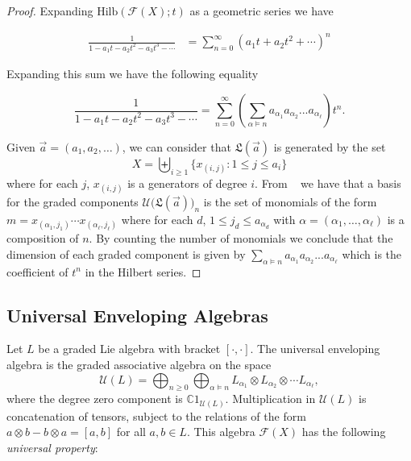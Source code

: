 \documentclass[11pt]{amsart}
\theoremstyle{definition}
\numberwithin{equation}{section}
\def\CC{{\mathbb C}}
\newcommand{\lucas}[1]{\todo[size=\tiny,color=red]{#1 \\ \hfill --- Lucas}}
\begin{document}
\begin{proof}
%
%
%
    Expanding $\mathrm{Hilb}(\mathcal{F}(X); t)$ as a geometric series we have 

    $${\begin{split}
        \frac{1}{1 - a_{1}t - a_{2}t^{2} - a_{3}t^{3} - \cdots} &= \sum_{n=0}^\infty (a_1t+a_2t^2+\cdots)^n
    \end{split}}$$

    Expanding this sum we have the following equality

    $$\frac{1}{1 - a_{1}t - a_{2}t^{2} - a_{3}t^{3} - \cdots}=\sum_{n=0}^\infty \left(\sum_ {\alpha \models n} a_{\alpha_1} a_{\alpha_2} ... a_{\alpha_\ell} \right) t^n.$$

    Given $\Vec{a} = (a_{1}, a_{2}, \ldots)$, we can consider that $\mathfrak{L}(\Vec{a})$ is generated by the set
    $$X=\biguplus_{i \geq 1}\{x_{(i,j)}: 1 \leq j \leq a_i\}$$
     where for each $j$, $x_{(i,j)}$ is a generators of degree $i$. From ~\cite[Theorem 7 (Witt)]{jacobson2013lie} we have that a basis for the graded components $\mathcal{U}\big(\mathfrak{L}(\vec{a})\big)_n$ is the set of monomials of the form $m=x_{(\alpha_1,j_1)} \cdots x_{(\alpha_\ell,j_\ell)}$ where
     for each $d$, $1 \leq j_d \leq a_{\alpha_{d}}$ with $\alpha=(\alpha_1,\dots,\alpha_\ell)$ is a composition of $n$.
By counting the number of monomials we conclude that the dimension of each graded component is given by $\sum_ {\alpha \models n} a_{\alpha_1} a_{\alpha_2} ... a_{\alpha_\ell}$ which is the coefficient of $t^n$ in the Hilbert series.

\end{proof}

\subsection{Universal Enveloping Algebras}
\label{sec:envelopingalgebras}

Let $L$ be a graded Lie algebra with bracket $[\cdot, \cdot]$.  The universal enveloping algebra is the graded associative algebra on the space
\[
\mathcal{U}(L) = \bigoplus_{n \ge 0} \bigoplus_{\alpha \vDash n} L_{\alpha_{1}} \otimes L_{\alpha_{2}} \otimes \cdots L_{\alpha_{\ell}},
\]
where the degree zero component is $\CC 1_{\mathcal{U}(L)}$.  Multiplication in $\mathcal{U}(L)$ is concatenation of tensors, subject to the relations of the form $a \otimes b - b \otimes a = [a, b]$ for all $a, b \in L$.  This algebra $\mathcal{F}(X)$ has the following \emph{universal property}:
\end{document}
